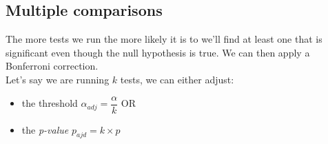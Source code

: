 \subsection{Multiple comparisons}
The more tests we run the more likely it is to we'll find at least one that is significant
even though the null hypothesis is true. We can then apply a Bonferroni correction.\\
Let's say we are running $k$ tests, we can either adjust: 
\begin{itemize}
	\item the threshold $\alpha_{adj} = \dfrac{\alpha}{k}$ OR
	\item the \emph{p-value} $p_{ajd} = k\times p$
\end{itemize}


